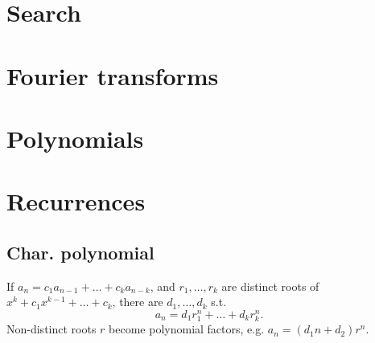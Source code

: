 \section{Search}


\section{Fourier transforms}


\section{Polynomials}

\section{Recurrences}
	\subsection{Char. polynomial}
	If $a_n = c_1 a_{n-1} + \dots + c_k a_{n-k}$, and $r_1, \dots, r_k$ are distinct roots of $x^k + c_1 x^{k-1} + \dots + c_k$, there are $d_1, \dots, d_k$ s.t.
	\[a_n = d_1r_1^n + \dots + d_kr_k^n. \]
	Non-distinct roots $r$ become polynomial factors, e.g. $a_n = (d_1n + d_2)r^n$.
